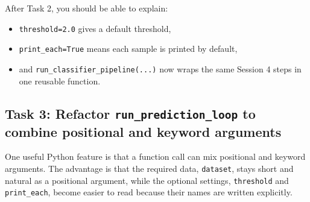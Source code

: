 \begin{tcolorbox}[title=Checkpoint]
After Task 2, you should be able to explain:
\begin{itemize}
    \item \texttt{threshold=2.0} gives a default threshold,
    \item \texttt{print\_each=True} means each sample is printed by default,
    \item and \texttt{run\_classifier\_pipeline(...)} now wraps the same Session 4 steps in one reusable function.
\end{itemize}
\end{tcolorbox}

\subsection{Task 3: Refactor \texttt{run\_prediction\_loop} to combine positional and keyword arguments}
One useful Python feature is that a function call can mix positional and keyword arguments. The advantage is that the required data, \texttt{dataset}, stays short and natural as a positional argument, while the optional settings, \texttt{threshold} and \texttt{print\_each}, become easier to read because their names are written explicitly. 


